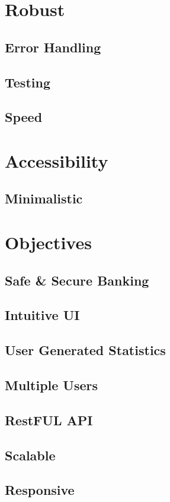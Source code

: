 \section{Robust}
\subsection{Error Handling}
\subsection{Testing}
\subsection{Speed}
\section{Accessibility}
\subsection{Minimalistic}
\section{Objectives}
\subsection{Safe \& Secure Banking}
\subsection{Intuitive UI}
\subsection{User Generated Statistics}
\subsection{Multiple Users}
\subsection{RestFUL API}
\subsection{Scalable}
\subsection{Responsive}
